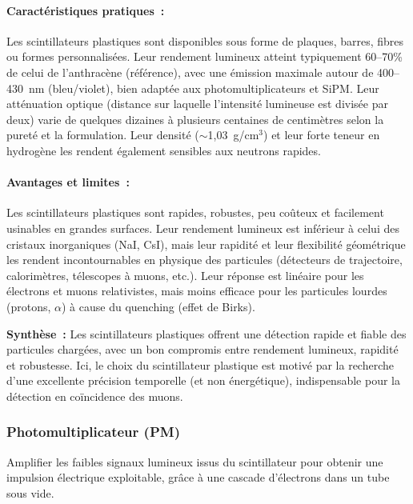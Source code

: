 \documentclass[a4paper,12pt,twoside]{article}
\begin{document}
\paragraph{Caractéristiques pratiques~:} Les scintillateurs plastiques sont disponibles sous forme de plaques, barres, fibres ou formes personnalisées. Leur rendement lumineux atteint typiquement 60--70\% de celui de l'anthracène (référence), avec une émission maximale autour de 400--430~nm (bleu/violet), bien adaptée aux photomultiplicateurs et SiPM. Leur atténuation optique (distance sur laquelle l'intensité lumineuse est divisée par deux) varie de quelques dizaines à plusieurs centaines de centimètres selon la pureté et la formulation. Leur densité ($\sim$1,03~g/cm$^3$) et leur forte teneur en hydrogène les rendent également sensibles aux neutrons rapides.

\paragraph{Avantages et limites~:} Les scintillateurs plastiques sont rapides, robustes, peu coûteux et facilement usinables en grandes surfaces. Leur rendement lumineux est inférieur à celui des cristaux inorganiques (NaI, CsI), mais leur rapidité et leur flexibilité géométrique les rendent incontournables en physique des particules (détecteurs de trajectoire, calorimètres, télescopes à muons, etc.). Leur réponse est linéaire pour les électrons et muons relativistes, mais moins efficace pour les particules lourdes (protons, $\alpha$) à cause du quenching (effet de Birks).


\begin{remarque}
\textbf{Synthèse~:} Les scintillateurs plastiques offrent une détection rapide et fiable des particules chargées, avec un bon compromis entre rendement lumineux, rapidité et robustesse. Ici, le choix du scintillateur plastique est motivé par la recherche d’une excellente précision temporelle (et non énergétique), indispensable pour la détection en coïncidence des muons.
\end{remarque}

\subsubsection*{Photomultiplicateur (PM)}


\vspace{1em}
\begin{center}
\begin{tcolorbox}[colback=blue!5!white, colframe=blue!60!black, title=Principe du photomultiplicateur (PM)]
Amplifier les faibles signaux lumineux issus du scintillateur pour obtenir une impulsion électrique exploitable, grâce à une cascade d’électrons dans un tube sous vide.
\end{tcolorbox}
\end{center}
\end{document}
